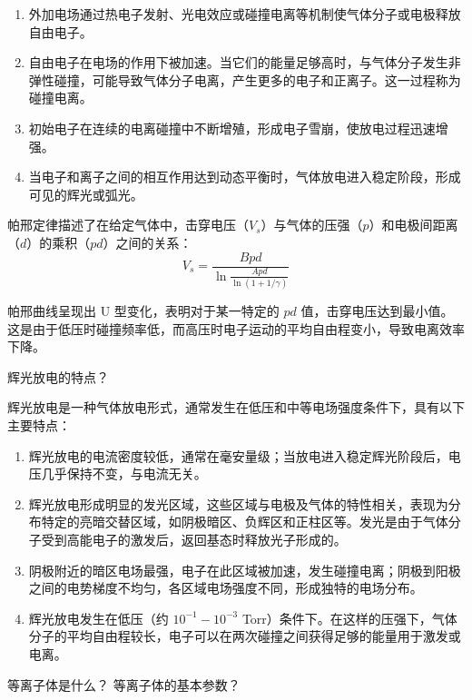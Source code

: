 \documentclass[dvipsnames, svgnames,a4paper,11pt]{article}
\begin{document}
	\begin{enumerate}
		\item 外加电场通过热电子发射、光电效应或碰撞电离等机制使气体分子或电极释放自由电子。

		\item 自由电子在电场的作用下被加速。当它们的能量足够高时，与气体分子发生非弹性碰撞，可能导致气体分子电离，产生更多的电子和正离子。这一过程称为碰撞电离。
	
		\item 初始电子在连续的电离碰撞中不断增殖，形成电子雪崩，使放电过程迅速增强。
	
		\item 当电子和离子之间的相互作用达到动态平衡时，气体放电进入稳定阶段，形成可见的辉光或弧光。
	\end{enumerate}


	帕邢定律描述了在给定气体中，击穿电压（$V_s$）与气体的压强（$p$）和电极间距离（$d$）的乘积（$pd$）之间的关系：
	\[
		V_s = \frac{Bpd}{\ln \frac{Apd}{\ln (1 + 1 / \gamma)}}
	\]

	帕邢曲线呈现出 U 型变化，表明对于某一特定的 $pd$ 值，击穿电压达到最小值。这是由于低压时碰撞频率低，而高压时电子运动的平均自由程变小，导致电离效率下降。



\begin{question}
	辉光放电的特点？
\end{question}

	辉光放电是一种气体放电形式，通常发生在低压和中等电场强度条件下，具有以下主要特点：

	\begin{enumerate}
		\item 辉光放电的电流密度较低，通常在毫安量级；当放电进入稳定辉光阶段后，电压几乎保持不变，与电流无关。
		\item 辉光放电形成明显的发光区域，这些区域与电极及气体的特性相关，表现为分布特定的亮暗交替区域，如阴极暗区、负辉区和正柱区等。发光是由于气体分子受到高能电子的激发后，返回基态时释放光子形成的。
		\item 阴极附近的暗区电场最强，电子在此区域被加速，发生碰撞电离；阴极到阳极之间的电势梯度不均匀，各区域电场强度不同，形成独特的电场分布。
		\item 辉光放电发生在低压（约 $10^{-1} - 10^{-3}$ Torr）条件下。在这样的压强下，气体分子的平均自由程较长，电子可以在两次碰撞之间获得足够的能量用于激发或电离。
	\end{enumerate}

	

\begin{question}
	等离子体是什么？ 等离子体的基本参数？
\end{question}
\end{document}
